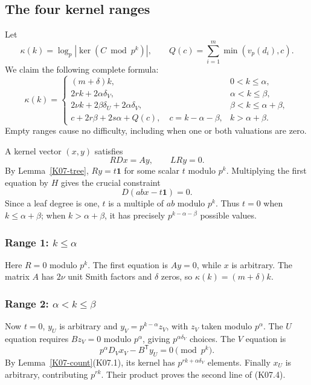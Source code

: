 \documentclass[11pt,a4paper]{article}
\theoremstyle{definition}\newtheorem{definition}[theorem]{Definition}
\theoremstyle{remark}\newtheorem{remark}[theorem]{Remark}
\numberwithin{equation}{section}
\begin{document}
\subsection{The four kernel ranges}\label{K07-sec-4}
Let
\[
 \kappa(k)=\log_p|\ker(C\bmod p^k)|,\qquad
 Q(c)=\sum_{i=1}^m\min(v_p(d_i),c).
\]
We claim the following complete formula:
\[
\kappa(k)=
\begin{cases}
 (m+\delta)k,&0<k\leq\alpha,\\
 2rk+2\alpha\delta_V,&\alpha<k\leq\beta,\\
 2\nu k+2\beta\delta_U+2\alpha\delta_V,
       &\beta<k\leq\alpha+\beta,\\
 c+2r\beta+2s\alpha+Q(c),\quad c=k-\alpha-\beta,
       &k>\alpha+\beta.
\end{cases}                                                   \tag{K07.4}
\]
Empty ranges cause no difficulty, including when one or both valuations are zero.

A kernel vector $(x,y)$ satisfies
\[
 RDx=Ay,\qquad LRy=0.                                        \tag{K07.5}
\]
By Lemma~\ref{K07-tree}, $Ry=t\boldsymbol1$ for some scalar $t$ modulo $p^k$. Multiplying the first equation by $H$ gives the crucial constraint
\[
 D(abx-t\boldsymbol1)=0.                                    \tag{K07.6}
\]
Since a leaf degree is one, $t$ is a multiple of $ab$ modulo $p^k$. Thus $t=0$ when $k\leq\alpha+\beta$; when $k>\alpha+\beta$, it has precisely $p^{k-\alpha-\beta}$ possible values.

\subsubsection*{Range 1: $k\leq\alpha$}
Here $R=0$ modulo $p^k$. The first equation is $Ay=0$, while $x$ is arbitrary. The matrix $A$ has $2\nu$ unit Smith factors and $\delta$ zeros, so $\kappa(k)=(m+\delta)k$.

\subsubsection*{Range 2: $\alpha<k\leq\beta$}
Now $t=0$, $y_U$ is arbitrary and $y_V=p^{k-\alpha}z_V$, with $z_V$ taken modulo $p^\alpha$. The $U$ equation requires $Bz_V=0$ modulo $p^\alpha$, giving $p^{\alpha\delta_V}$ choices. The $V$ equation is
\[
 p^\alpha D_Vx_V-B^{\mathsf T}y_U=0\pmod{p^k}.
\]
By Lemma~\ref{K07-count}(K07.1), its kernel has $p^{rk+\alpha\delta_V}$ elements. Finally $x_U$ is arbitrary, contributing $p^{rk}$. Their product proves the second line of (K07.4).
\end{document}

